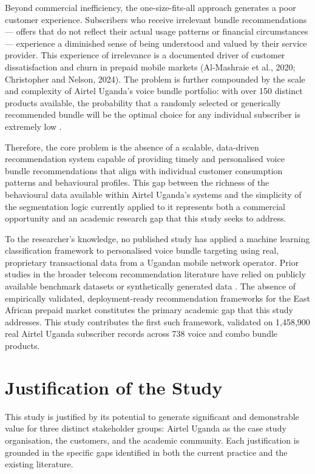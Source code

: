 Beyond commercial inefficiency, the one-size-fits-all approach generates a poor customer experience. Subscribers who receive irrelevant bundle recommendations --- offers that do not reflect their actual usage patterns or financial circumstances --- experience a diminished sense of being understood and valued by their service provider. This experience of irrelevance is a documented driver of customer dissatisfaction and churn in prepaid mobile markets (Al-Mashraie et al., 2020; Christopher and Nelson, 2024). The problem is further compounded by the scale and complexity of Airtel Uganda's voice bundle portfolio: with over 150 distinct products available, the probability that a randomly selected or generically recommended bundle will be the optimal choice for any individual subscriber is extremely low \cite{ref55}.

Therefore, the core problem is the absence of a scalable, data-driven recommendation system capable of providing timely and personalised voice bundle recommendations that align with individual customer consumption patterns and behavioural profiles. This gap between the richness of the behavioural data available within Airtel Uganda's systems and the simplicity of the segmentation logic currently applied to it represents both a commercial opportunity and an academic research gap that this study seeks to address.

To the researcher's knowledge, no published study has applied a machine learning classification framework to personalised voice bundle targeting using real, proprietary transactional data from a Ugandan mobile network operator. Prior studies in the broader telecom recommendation literature have relied on publicly available benchmark datasets or synthetically generated data \cite{ref11, ref8, ref51}. The absence of empirically validated, deployment-ready recommendation frameworks for the East African prepaid market constitutes the primary academic gap that this study addresses. This study contributes the first such framework, validated on 1,458,900 real Airtel Uganda subscriber records across 738 voice and combo bundle products.

\section{Justification of the Study}

This study is justified by its potential to generate significant and demonstrable value for three distinct stakeholder groups: Airtel Uganda as the case study organisation, the customers, and the academic community. Each justification is grounded in the specific gaps identified in both the current practice and the existing literature.


